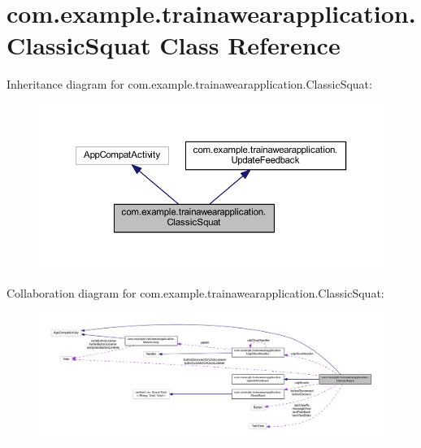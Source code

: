 \hypertarget{classcom_1_1example_1_1trainawearapplication_1_1_classic_squat}{}\section{com.\+example.\+trainawearapplication.\+Classic\+Squat Class Reference}
\label{classcom_1_1example_1_1trainawearapplication_1_1_classic_squat}


Inheritance diagram for com.\+example.\+trainawearapplication.\+Classic\+Squat\+:
\nopagebreak
\begin{figure}[H]
\begin{center}
\leavevmode
\includegraphics[width=350pt]{classcom_1_1example_1_1trainawearapplication_1_1_classic_squat__inherit__graph}
\end{center}
\end{figure}


Collaboration diagram for com.\+example.\+trainawearapplication.\+Classic\+Squat\+:
\nopagebreak
\begin{figure}[H]
\begin{center}
\leavevmode
\includegraphics[width=350pt]{classcom_1_1example_1_1trainawearapplication_1_1_classic_squat__coll__graph}
\end{center}
\end{figure}

